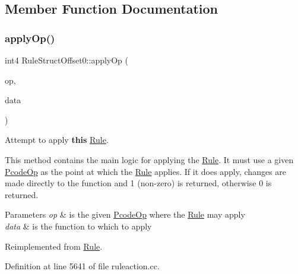 \subsection{Member Function Documentation}
\mbox{\label{class_rule_struct_offset0_a925e149a62faa06ea1e64a9b9b52a47f}} 
\subsubsection{\texorpdfstring{applyOp()}{applyOp()}}
{\footnotesize\ttfamily int4 Rule\+Struct\+Offset0\+::apply\+Op (\begin{DoxyParamCaption}\item[{\mbox{\hyperlink{class_pcode_op}{Pcode\+Op}} $\ast$}]{op,  }\item[{\mbox{\hyperlink{class_funcdata}{Funcdata}} \&}]{data }\end{DoxyParamCaption})\hspace{0.3cm}{\ttfamily [virtual]}}



Attempt to apply {\bfseries{this}} \mbox{\hyperlink{class_rule}{Rule}}. 

This method contains the main logic for applying the \mbox{\hyperlink{class_rule}{Rule}}. It must use a given \mbox{\hyperlink{class_pcode_op}{Pcode\+Op}} as the point at which the \mbox{\hyperlink{class_rule}{Rule}} applies. If it does apply, changes are made directly to the function and 1 (non-\/zero) is returned, otherwise 0 is returned. 
\begin{DoxyParams}{Parameters}
{\em op} & is the given \mbox{\hyperlink{class_pcode_op}{Pcode\+Op}} where the \mbox{\hyperlink{class_rule}{Rule}} may apply \\
\hline
{\em data} & is the function to which to apply \\
\hline
\end{DoxyParams}


Reimplemented from \mbox{\hyperlink{class_rule_a4e3e61f066670175009f60fb9dc60848}{Rule}}.



Definition at line 5641 of file ruleaction.\+cc.

